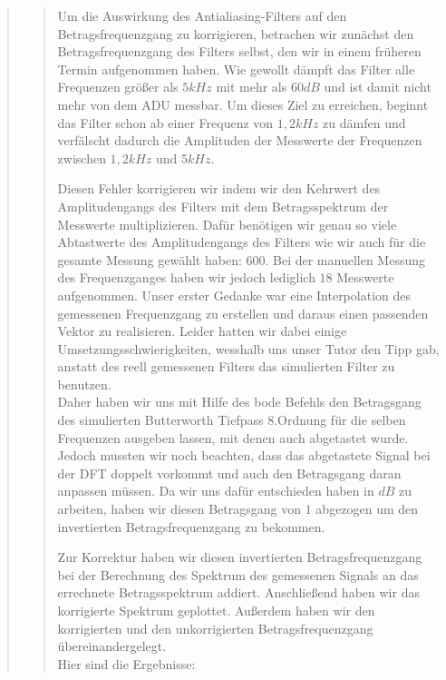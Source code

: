 \begin{quote}
\begin{quote}
        Um die Auswirkung des Antialiasing-Filters auf den Betragsfrequenzgang
        zu korrigieren, betrachen wir zunächst den Betragsfrequenzgang des
        Filters selbst, den wir in einem früheren Termin aufgenommen haben. Wie gewollt dämpft das Filter alle Frequenzen 
        größer als $5kHz$ mit mehr als $60dB$ und ist damit nicht mehr von dem ADU messbar.
        Um dieses Ziel zu erreichen, beginnt das Filter schon ab einer Frequenz
        von $1,2 kHz$ zu dämfen und verfälscht dadurch die Amplituden der Messwerte der Frequenzen 
        zwischen $1,2 kHz$ und $5 kHz$.
        
        \vspace{1em}
        
        Diesen Fehler korrigieren wir indem wir den Kehrwert des Amplitudengangs des Filters mit dem Betragsspektrum der
        Messwerte multiplizieren. Dafür benötigen wir genau so viele Abtastwerte
        des Amplitudengangs des Filters wie wir auch für die gesamte Messung gewählt haben: $600$. 
        Bei der manuellen Messung des Frequenzganges haben wir jedoch
        lediglich $18$ Messwerte aufgenommen. Unser erster Gedanke war eine Interpolation des gemessenen Frequenzgang zu
        erstellen und daraus einen passenden Vektor zu realisieren. Leider
        hatten wir dabei einige Umsetzungsschwierigkeiten, wesshalb uns unser
        Tutor den Tipp gab, anstatt des reell gemessenen Filters das simulierten
        Filter zu benutzen.\\
        Daher haben wir uns mit Hilfe des bode Befehls den Betragsgang des simulierten Butterworth Tiefpass 8.Ordnung
        für die selben Frequenzen ausgeben lassen, mit denen auch abgetastet
        wurde. Jedoch mussten wir noch beachten, dass das abgetastete Signal bei der DFT doppelt vorkommt 
        und auch den Betragsgang daran anpassen müssen. Da wir
        uns dafür entschieden haben in $dB$ zu arbeiten, haben wir diesen
        Betragsgang von $1$ abgezogen um den invertierten Betragsfrequenzgang zu bekommen.\vspace{1em}
        
        Zur Korrektur haben wir diesen invertierten Betragsfrequenzgang bei der
        Berechnung des Spektrum des gemessenen Signals an das errechnete
        Betragsspektrum addiert. Anschließend haben wir das korrigierte Spektrum geplottet.
        Außerdem haben wir den korrigierten und den unkorrigierten Betragsfrequenzgang übereinandergelegt.\\
        Hier sind die Ergebnisse:\\
        

\end{quote}
\end{quote}

